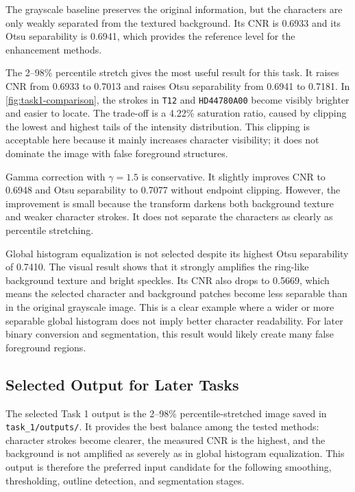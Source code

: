 The grayscale baseline preserves the original information, but the characters
are only weakly separated from the textured background.  Its CNR is 0.6933 and
its Otsu separability is 0.6941, which provides the reference level for the
enhancement methods.

The 2--98\% percentile stretch gives the most useful result for this task.  It
raises CNR from 0.6933 to 0.7013 and raises Otsu separability from 0.6941 to
0.7181.  In \cref{fig:task1-comparison}, the strokes in \texttt{T12} and
\texttt{HD44780A00} become visibly brighter and easier to locate.  The trade-off
is a 4.22\% saturation ratio, caused by clipping the lowest and highest tails of
the intensity distribution.  This clipping is acceptable here because it mainly
increases character visibility; it does not dominate the image with false
foreground structures.

Gamma correction with $\gamma=1.5$ is conservative.  It slightly improves CNR
to 0.6948 and Otsu separability to 0.7077 without endpoint clipping.  However,
the improvement is small because the transform darkens both background texture
and weaker character strokes.  It does not separate the characters as clearly as
percentile stretching.

Global histogram equalization is not selected despite its highest Otsu
separability of 0.7410.  The visual result shows that it strongly amplifies the
ring-like background texture and bright speckles.  Its CNR also drops to 0.5669,
which means the selected character and background patches become less separable
than in the original grayscale image.  This is a clear example where a wider or
more separable global histogram does not imply better character readability.
For later binary conversion and segmentation, this result would likely create
many false foreground regions.

\subsection{Selected Output for Later Tasks}

The selected Task 1 output is the 2--98\% percentile-stretched image saved in
\texttt{task\_1/outputs/}.  It provides the best balance among the tested
methods: character strokes become clearer, the measured CNR is the highest, and
the background is not amplified as severely as in global histogram equalization.
This output is therefore the preferred input candidate for the following
smoothing, thresholding, outline detection, and segmentation stages.

\FloatBarrier
